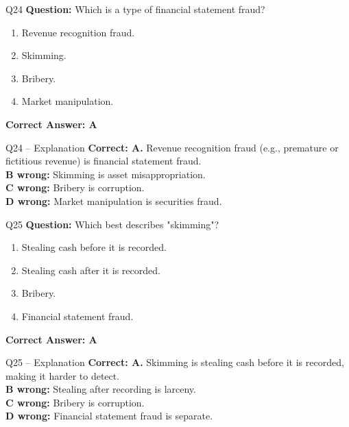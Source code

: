 \documentclass[aspectratio=169,10pt]{beamer}
\begin{document}
	\begin{frame}[t]{Q24}
		\small
		\textbf{Question:} Which is a type of financial statement fraud?
		\begin{enumerate}[label=\Alph*.,itemsep=1pt,topsep=2pt]
			\item Revenue recognition fraud.
			\item Skimming.
			\item Bribery.
			\item Market manipulation.
		\end{enumerate}
		\vspace{4pt}
		\textbf{Correct Answer: A}
	\end{frame}
	
	\begin{frame}[t]{Q24 -- Explanation}
		\small
		\textbf{Correct: A.} Revenue recognition fraud (e.g., premature or fictitious revenue) is financial statement fraud. \\[4pt]
		\textbf{B wrong:} Skimming is asset misappropriation. \\[2pt]
		\textbf{C wrong:} Bribery is corruption. \\[2pt]
		\textbf{D wrong:} Market manipulation is securities fraud.
	\end{frame}
	
	\begin{frame}[t]{Q25}
		\small
		\textbf{Question:} Which best describes "skimming"?
		\begin{enumerate}[label=\Alph*.,itemsep=1pt,topsep=2pt]
			\item Stealing cash before it is recorded.
			\item Stealing cash after it is recorded.
			\item Bribery.
			\item Financial statement fraud.
		\end{enumerate}
		\vspace{4pt}
		\textbf{Correct Answer: A}
	\end{frame}
	
	\begin{frame}[t]{Q25 -- Explanation}
		\small
		\textbf{Correct: A.} Skimming is stealing cash before it is recorded, making it harder to detect. \\[4pt]
		\textbf{B wrong:} Stealing after recording is larceny. \\[2pt]
		\textbf{C wrong:} Bribery is corruption. \\[2pt]
		\textbf{D wrong:} Financial statement fraud is separate.
	\end{frame}
	
\end{document}
